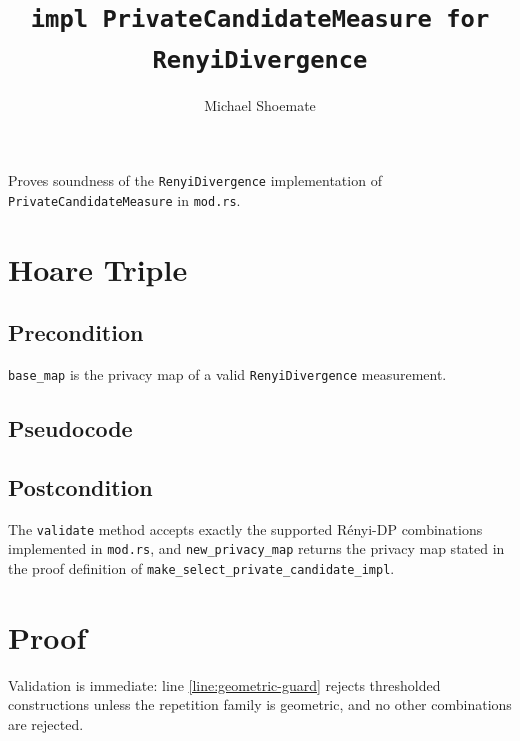 \documentclass{article}
\title{\texttt{impl PrivateCandidateMeasure for RenyiDivergence}}
\author{Michael Shoemate}
\date{}
\begin{document}
\maketitle

Proves soundness of the \texttt{RenyiDivergence} implementation of
\texttt{PrivateCandidateMeasure} in \texttt{mod.rs}.

\section{Hoare Triple}
\subsection*{Precondition}
\texttt{base\_map} is the privacy map of a valid \texttt{RenyiDivergence} measurement.

\subsection*{Pseudocode}


\subsection*{Postcondition}
\begin{theorem}
\label{postcondition}
The \texttt{validate} method accepts exactly the supported Rényi-DP combinations implemented in
\texttt{mod.rs}, and \texttt{new\_privacy\_map} returns the privacy map stated in the proof
definition of \texttt{make\_select\_private\_candidate\_impl}.
\end{theorem}

\section{Proof}
Validation is immediate: line \ref{line:geometric-guard} rejects thresholded constructions unless
the repetition family is geometric, and no other combinations are rejected.
\end{document}
